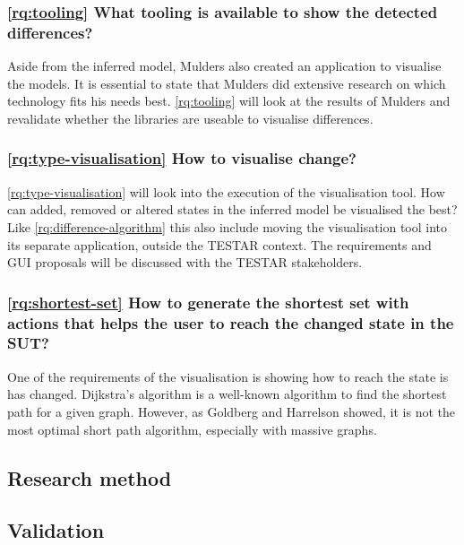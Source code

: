 \subsubsection{\ref{rq:tooling} What tooling is available to show the detected differences?}
Aside from the inferred model, Mulders also created an application to visualise the models. It is essential to state that Mulders did extensive research on which technology fits his needs best. \ref{rq:tooling} will look at the results of Mulders and revalidate whether the libraries are useable to visualise differences. 

\subsubsection{\ref{rq:type-visualisation} How to visualise change?}
\ref{rq:type-visualisation} will look into the execution of the visualisation tool. How can added, removed or altered states in the inferred model be visualised the best? Like \ref{rq:difference-algorithm} this also include moving the visualisation tool into its separate application, outside the TESTAR context. The requirements and GUI proposals will be discussed with the TESTAR stakeholders. 

\subsubsection{\ref{rq:shortest-set} How to generate the shortest set with actions that helps the user to reach the changed state in the SUT?}
One of the requirements of the visualisation is showing how to reach the state is has changed. Dijkstra's algorithm \cite{dijkstra1959note} is a well-known algorithm to find the shortest path for a given graph. However, as Goldberg and Harrelson \cite{goldberg2005computing} showed, it is not the most optimal short path algorithm, especially with massive graphs. 


    \subsection{Research method}
    
        
        
    \subsection{Validation}
    

    